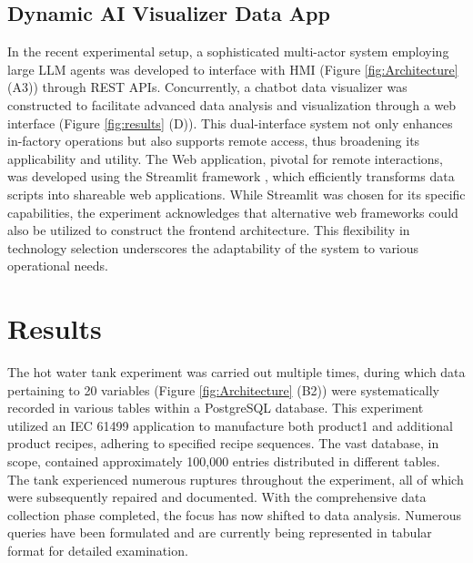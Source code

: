 \begin{bibunit}
\subsection{Dynamic AI Visualizer Data App}

In the recent experimental setup, a sophisticated multi-actor system employing large LLM agents was developed to interface with HMI (Figure \ref{fig:Architecture} (A3)) through REST APIs. Concurrently, a chatbot data visualizer was constructed to facilitate advanced data analysis and visualization through a web interface (Figure \ref{fig:results} (D)). This dual-interface system not only enhances in-factory operations but also supports remote access, thus broadening its applicability and utility. The Web application, pivotal for remote interactions, was developed using the Streamlit framework \cite{streamlit2023homepage}, which efficiently transforms data scripts into shareable web applications. While Streamlit was chosen for its specific capabilities, the experiment acknowledges that alternative web frameworks could also be utilized to construct the frontend architecture. This flexibility in technology selection underscores the adaptability of the system to various operational needs.



\section{Results}

The hot water tank experiment was carried out multiple times, during which data pertaining to 20 variables (Figure \ref{fig:Architecture} (B2)) were systematically recorded in various tables within a PostgreSQL database. This experiment utilized an IEC 61499 application to manufacture both product1 and additional product recipes, adhering to specified recipe sequences. The vast database, in scope, contained approximately 100,000 entries distributed in different tables. The tank experienced numerous ruptures throughout the experiment, all of which were subsequently repaired and documented. With the comprehensive data collection phase completed, the focus has now shifted to data analysis. Numerous queries have been formulated and are currently being represented in tabular format for detailed examination.


\end{bibunit}
